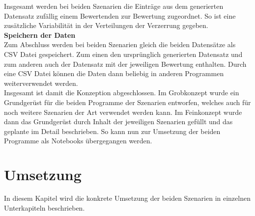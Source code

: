 \begin{onehalfspace}
Insgesamt werden bei beiden Szenarien die Einträge aus dem generierten Datensatz zufällig einem Bewertenden zur Bewertung zugeordnet. So ist eine zusätzliche Variabilität in der Verteilungen der Verzerrung gegeben.\\
\textbf{Speichern der Daten}\\
Zum Abschluss werden bei beiden Szenarien gleich die beiden Datensätze als CSV Datei gespeichert. Zum einen den ursprünglich generierten Datensatz und zum anderen auch der Datensatz mit der jeweiligen Bewertung enthalten. Durch eine CSV Datei können die Daten dann beliebig in anderen Programmen weiterverwendet werden.\\
Insgesamt ist damit die Konzeption abgeschlossen. Im Grobkonzept wurde ein Grundgerüst für die beiden Programme der Szenarien entworfen, welches auch für noch weitere Szenarien der Art verwendet werden kann. Im Feinkonzept wurde dann das Grundgerüst durch Inhalt der jeweiligen Szenarien gefüllt und das geplante im Detail beschrieben. So kann nun zur Umsetzung der beiden Programme als Notebooks übergegangen werden.

\section{Umsetzung}
\label{umsetzung}
In diesem Kapitel wird die konkrete Umsetzung der beiden Szenarien in einzelnen Unterkapiteln beschrieben.

\end{onehalfspace}
